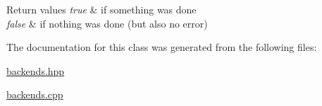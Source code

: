 \begin{DoxyRetVals}{Return values}
{\em true} & if something was done \\
\hline
{\em false} & if nothing was done (but also no error) \\
\hline
\end{DoxyRetVals}


The documentation for this class was generated from the following files\+:\begin{DoxyCompactItemize}
\item 
\mbox{\hyperlink{backends_8hpp}{backends.\+hpp}}\item 
\mbox{\hyperlink{backends_8cpp}{backends.\+cpp}}\end{DoxyCompactItemize}
